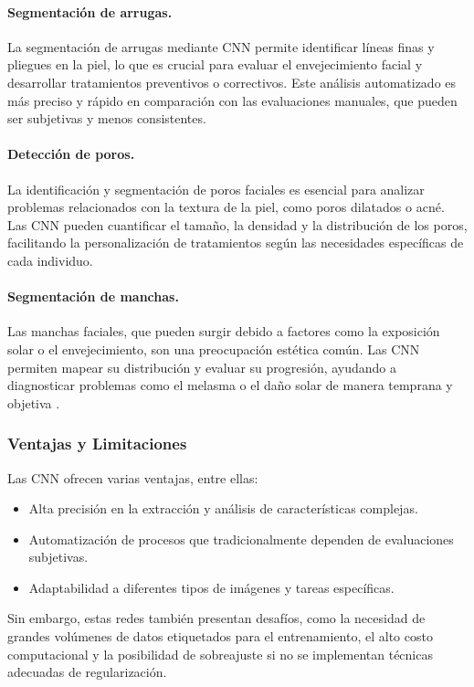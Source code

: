 \paragraph{Segmentación de arrugas.}  
La segmentación de arrugas mediante CNN permite identificar líneas finas y pliegues en la piel, lo que es crucial para evaluar el envejecimiento facial y desarrollar tratamientos preventivos o correctivos. Este análisis automatizado es más preciso y rápido en comparación con las evaluaciones manuales, que pueden ser subjetivas y menos consistentes.

\paragraph{Detección de poros.}  
La identificación y segmentación de poros faciales es esencial para analizar problemas relacionados con la textura de la piel, como poros dilatados o acné. Las CNN pueden cuantificar el tamaño, la densidad y la distribución de los poros, facilitando la personalización de tratamientos según las necesidades específicas de cada individuo.

\paragraph{Segmentación de manchas.}  
Las manchas faciales, que pueden surgir debido a factores como la exposición solar o el envejecimiento, son una preocupación estética común. Las CNN permiten mapear su distribución y evaluar su progresión, ayudando a diagnosticar problemas como el melasma o el daño solar de manera temprana y objetiva \parencite{autor2020imagen}.

\subsubsection{Ventajas y Limitaciones}  
Las CNN ofrecen varias ventajas, entre ellas:
\begin{itemize}
    \item Alta precisión en la extracción y análisis de características complejas.
    \item Automatización de procesos que tradicionalmente dependen de evaluaciones subjetivas.
    \item Adaptabilidad a diferentes tipos de imágenes y tareas específicas.
\end{itemize}

Sin embargo, estas redes también presentan desafíos, como la necesidad de grandes volúmenes de datos etiquetados para el entrenamiento, el alto costo computacional y la posibilidad de sobreajuste si no se implementan técnicas adecuadas de regularización.

